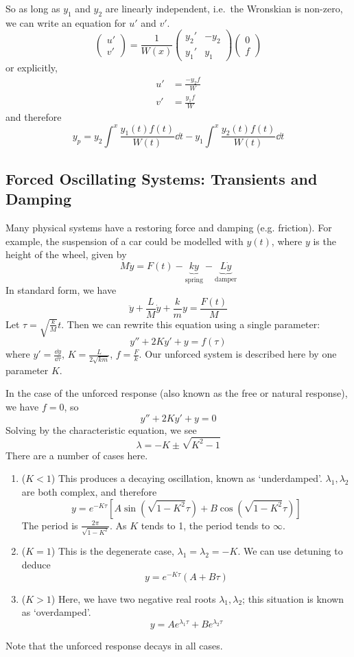 So as long as \(y_1\) and \(y_2\) are linearly independent, i.e.\ the Wronskian is non-zero, we can write an equation for \(u'\) and \(v'\).
\[
	\begin{pmatrix}
		u' \\ v'
	\end{pmatrix} = \frac{1}{W(x)}\begin{pmatrix}
		y_2' & -y_2 \\ y_1' & y_1
	\end{pmatrix} \begin{pmatrix}
		0 \\ f
	\end{pmatrix}
\]
or explicitly,
\begin{align*}
	u' & = \frac{-y_2 f}{W} \\
	v' & = \frac{y_1 f}{W}
\end{align*}
and therefore
\[
	y_p = y_2 \int^x \frac{y_1(t) f(t)}{W(t)}\dd{t} - y_1 \int^x \frac{y_2(t) f(t)}{W(t)}\dd{t}
\]

\subsection{Forced Oscillating Systems: Transients and Damping}
Many physical systems have a restoring force and damping (e.g.
friction).
For example, the suspension of a car could be modelled with \(y(t)\), where \(y\) is the height of the wheel, given by
\[
	M\ddot y = F(t) - \underbrace{ky}_{\text{spring}} - \underbrace{L\dot y}_{\text{damper}}
\]
In standard form, we have
\[
	\ddot y + \frac{L}{M} \dot y + \frac{k}{m} y = \frac{F(t)}{M}
\]
Let \(\tau = \sqrt{\frac{k}{M}} t\).
Then we can rewrite this equation using a single parameter:
\[
	y'' + 2Ky' + y = f(\tau)
\]
where \(y' = \frac{\dd{y}}{\dd \tau}\), \(K = \frac{L}{2\sqrt{km}}\), \(f = \frac{F}{k}\).
Our unforced system is described here by one parameter \(K\).

In the case of the unforced response (also known as the free or natural response), we have \(f=0\), so
\[
	y'' + 2Ky' + y = 0
\]
Solving by the characteristic equation, we see
\[
	\lambda = -K \pm \sqrt{K^2 - 1}
\]
There are a number of cases here.
\begin{enumerate}
	\item (\(K < 1\)) This produces a decaying oscillation, known as `underdamped'.
	      \(\lambda_1, \lambda_2\) are both complex, and therefore
	      \[
		      y = e^{-K\tau}\left[A\sin(\sqrt{1-K^2}\tau) + B\cos(\sqrt{1-K^2}\tau)\right]
	      \]
	      The period is \(\frac{2\pi}{\sqrt{1-K^2}}\).
	      As \(K\) tends to 1, the period tends to \(\infty\).
	\item (\(K = 1\)) This is the degenerate case, \(\lambda_1 = \lambda_2 = -K\).
	      We can use detuning to deduce
	      \[
		      y = e^{-K\tau} (A + B\tau)
	      \]
	\item (\(K > 1\)) Here, we have two negative real roots \(\lambda_1, \lambda_2\); this situation is known as `overdamped'.
	      \[
		      y = Ae^{\lambda_1 \tau} + Be^{\lambda_2 \tau}
	      \]
\end{enumerate}
Note that the unforced response decays in all cases.
